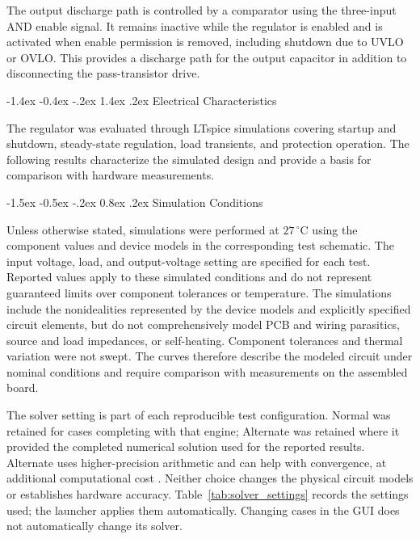 \documentclass[conference]{IEEEtran}
\makeatletter
\renewcommand\section{\@startsection{section}{1}{\z@}%
  {-1.4ex \@plus -0.4ex \@minus -.2ex}%
  {1.4ex \@plus .2ex}%
  {\normalfont\sffamily\large\bfseries\centering}}
\renewcommand\subsection{\@startsection{subsection}{2}{\z@}%
  {-1.5ex \@plus -0.5ex \@minus -.2ex}%
  {0.8ex \@plus .2ex}%
  {\normalfont\sffamily\normalsize\bfseries}}
\makeatother
\begin{document}
The output discharge path is controlled by a comparator
using the three-input AND enable signal. It remains
inactive while the regulator is enabled and is activated
when enable permission is removed, including shutdown
due to UVLO or OVLO. This provides a discharge path
for the output capacitor in addition to disconnecting
the pass-transistor drive.

\section{Electrical Characteristics}

The regulator was evaluated through LTspice simulations
covering startup and shutdown, steady-state regulation,
load transients, and protection operation. The following
results characterize the simulated design and provide
a basis for comparison with hardware measurements.

\subsection{Simulation Conditions}

Unless otherwise stated, simulations were performed
at \(27\,^{\circ}\mathrm{C}\) using the component values
and device models in the corresponding test schematic.
The input voltage, load, and output-voltage setting
are specified for each test. Reported values apply
to these simulated conditions and do not represent
guaranteed limits over component tolerances or temperature.
The simulations include the nonidealities represented by the
device models and explicitly specified circuit elements, but do
not comprehensively model PCB and wiring parasitics, source and
load impedances, or self-heating. Component tolerances and thermal
variation were not swept. The curves therefore describe the
modeled circuit under nominal conditions and require comparison
with measurements on the assembled board.


The solver setting is part of each reproducible test configuration.
Normal was retained for cases completing with that engine; Alternate
was retained where it provided the completed numerical solution used
for the reported results. Alternate uses higher-precision arithmetic
and can help with convergence, at additional computational cost
\cite{adi_ltspice_solver_2026}. Neither choice changes the physical
circuit models or establishes hardware accuracy. Table~\ref{tab:solver_settings}
records the settings used; the launcher applies them automatically.
Changing cases in the GUI does not automatically change its solver.
\end{document}
